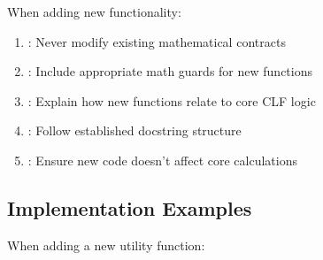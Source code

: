 \documentclass[letterpaper,10pt,english]{sphinxmanual}
\begin{document}
\sphinxAtStartPar
{}

\sphinxAtStartPar
When adding new functionality:
\begin{enumerate}
%
\item {} 
\sphinxAtStartPar
{}: Never modify existing mathematical contracts

\item {} 
\sphinxAtStartPar
{}: Include appropriate math guards for new functions

\item {} 
\sphinxAtStartPar
{}: Explain how new functions relate to core CLF logic

\item {} 
\sphinxAtStartPar
{}: Follow established docstring structure

\item {} 
\sphinxAtStartPar
{}: Ensure new code doesn’t affect core calculations

\end{enumerate}


\subsection{Implementation Examples}
\label{\detokenize{docstring_guide:implementation-examples}}
\sphinxAtStartPar
{}

\sphinxAtStartPar
When adding a new utility function:
\end{document}
